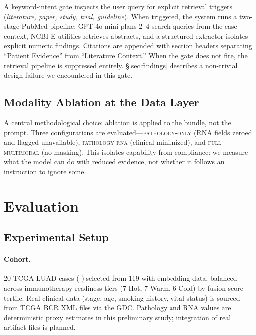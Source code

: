\documentclass[11pt]{article}
\begin{document}
A keyword-intent gate inspects the user query for explicit retrieval triggers (\emph{literature, paper, study, trial, guideline}). When triggered, the system runs a two-stage PubMed pipeline: GPT-4o-mini plans 2--4 search queries from the case context, NCBI E-utilities retrieves abstracts, and a structured extractor isolates explicit numeric findings. Citations are appended with section headers separating ``Patient Evidence'' from ``Literature Context.'' When the gate does not fire, the retrieval pipeline is suppressed entirely. \S\ref{sec:findings} describes a non-trivial design failure we encountered in this gate.

\subsection{Modality Ablation at the Data Layer}

A central methodological choice: ablation is applied to the bundle, not the prompt. Three configurations are evaluated—\textsc{pathology-only} (RNA fields zeroed and flagged unavailable), \textsc{pathology-rna} (clinical minimized), and \textsc{full-multimodal} (no masking). This isolates capability from compliance: we measure what the model can do with reduced evidence, not whether it follows an instruction to ignore some.

\section{Evaluation}

\subsection{Experimental Setup}

\paragraph{Cohort.}
20 TCGA-LUAD cases (\citeauthor{tcga2014luad} \citeyear{tcga2014luad}) selected from 119 with embedding data, balanced across immunotherapy-readiness tiers (7 Hot, 7 Warm, 6 Cold) by fusion-score tertile. Real clinical data (stage, age, smoking history, vital status) is sourced from TCGA BCR XML files via the GDC. Pathology and RNA values are deterministic proxy estimates in this preliminary study; integration of real artifact files is planned.
\end{document}
